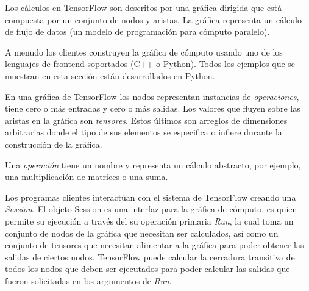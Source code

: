 \begin{remark}
Los cálculos en TensorFlow son descritos por una gráfica dirigida
que está compuesta por un conjunto de nodos y aristas.
La gráfica representa un cálculo de flujo de datos (un modelo
de programación para cómputo paralelo).
\end{remark}
A menudo los clientes construyen la gráfica de cómputo usando uno de los
lenguajes de frontend soportados (C++ o Python). Todos los ejemplos
que se muestran en esta sección están desarrollados en Python.

En una gráfica de TensorFlow los nodos representan instancias de \textit{operaciones}, tiene cero o más entradas y
cero o más salidas. Los valores que fluyen sobre las aristas en la gráfica son
\textit{tensores}. Estos últimos son arreglos de dimensiones arbitrarias donde el tipo
de sus elementos se especifica o infiere durante la construcción de la gráfica.

Una \textit{operación} tiene un nombre y representa un cálculo abstracto, por ejemplo,
una multiplicación de matrices o una suma. 

Los programas clientes interactúan con el sistema de TensorFlow creando una
\textit{Session}. El objeto Session es una interfaz para la gráfica de cómputo,
es quien permite su ejecución a través del su operación primaria
\textit{Run}, la cual toma un conjunto de nodos de la gráfica que necesitan ser
calculados, así como un conjunto de tensores que necesitan alimentar a la 
gráfica para poder obtener las salidas de ciertos nodos. TensorFlow puede calcular
la cerradura transitiva de todos los nodos que deben ser ejecutados
para poder calcular las salidas que fueron solicitadas en los argumentos de \textit{Run}.

